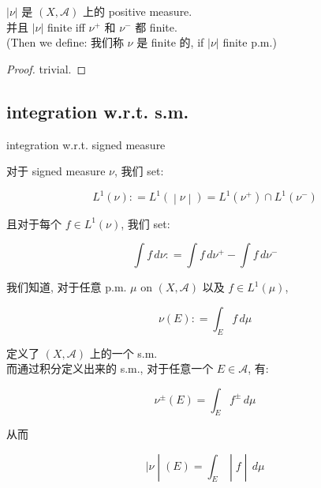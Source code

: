 \documentclass{qlnotes-export}
\begin{document}
\begin{lemma}\label{lem-10-signed-measure-jordan-decomposition-lemma-006}

\(|\nu|\) 是 \((X,\mathcal{A})\) 上的 positive measure.\\
并且 \(|\nu|\) finite iff \(\nu^{+}\) 和 \(\nu^{-}\) 都 finite.\\
(Then we define: 我们称 \(\nu\) 是 finite 的, if \(|\nu|\) finite p.m.)

\end{lemma}

\begin{proof}

trivial.

\end{proof}

\subsection{integration w.r.t. s.m.}\label{integration-w.r.t.-s.m.}

\begin{definition}{integration w.r.t. signed measure}\label{def-10-signed-measure-jordan-decomposition-integration-w-r-t-signed-measure}

对于 signed measure \(\nu\), 我们 set:

\[\left. L^{1}(\nu): = L^{1}( \middle| \nu \middle| ) = L^{1}(\nu^{+}) \cap L^{1}(\nu^{-}) \right.\]

且对于每个 \(f \in L^{1}(\nu)\), 我们 set:

\[\int f\, d\nu: = \int f\, d\nu^{+} - \int f\, d\nu^{-}\]

\end{definition}

\begin{proposition}\label{prop-10-signed-measure-jordan-decomposition-proposition-004}

我们知道, 对于任意 p.m. \(\mu\) on \((X,\mathcal{A})\) 以及 \(f \in L^{1}(\mu)\),

\[\nu(E): = \int_{E}f\, d\mu\]

定义了 \((X,\mathcal{A})\) 上的一个 s.m.\\
而通过积分定义出来的 s.m., 对于任意一个 \(E \in \mathcal{A}\), 有:

\[\nu^{\pm}(E) = \int_{E}f^{\pm}\, d\mu\]

从而

\[\left. |\nu \middle| (E) = \int_{E} \middle| f \middle| \, d\mu \right.\]

\end{proposition}
\end{document}
